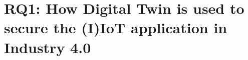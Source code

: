 %
%
\section{RQ1: How Digital Twin is used to secure the (I)IoT application in Industry 4.0}







